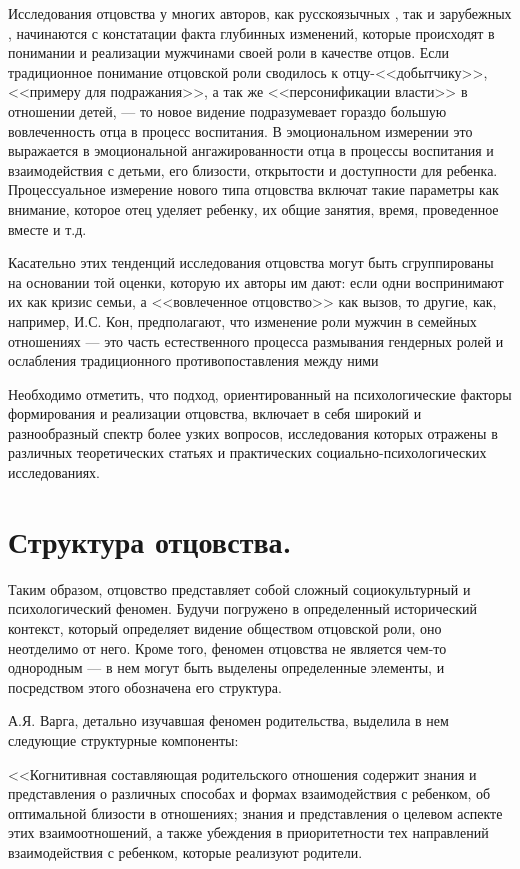 \documentclass{../../common/thesisbyxetex}
\begin{document}
Исследования отцовства у многих авторов, как русскоязычных \cite{relot, psyot}, так и зарубежных
\cite{meta, morfat, legfat}, начинаются с констатации факта глубинных изменений, которые происходят
в понимании и реализации мужчинами своей роли в качестве отцов. Если традиционное понимание
отцовской роли сводилось к отцу-<<добытчику>>, <<примеру для подражания>>, а так же
<<персонификации власти>> в отношении детей, --- то новое видение подразумевает гораздо большую
вовлеченность отца в процесс воспитания. В эмоциональном измерении это выражается в  эмоциональной
ангажированности отца в процессы воспитания и взаимодействия с детьми, его близости, открытости и
доступности для ребенка. Процессуальное измерение нового типа отцовства включат такие параметры как
внимание, которое отец уделяет ребенку, их общие занятия, время, проведенное вместе и т.д.


Касательно этих тенденций исследования отцовства могут быть сгруппированы на основании той оценки,
которую их авторы им дают: если одни воспринимают их как кризис семьи, а <<вовлеченное отцовство>>
как вызов, то другие, как, например, И.С. Кон, предполагают, что изменение роли мужчин в семейных
отношениях --- это часть естественного процесса размывания гендерных ролей и ослабления
традиционного противопоставления между ними \cite{konmen}

Необходимо отметить, что подход, ориентированный на психологические факторы формирования и
реализации отцовства, включает в себя широкий и разнообразный спектр более узких вопросов,
исследования которых отражены в различных теоретических статьях и практических
социально-психологических исследованиях.



\section{Структура отцовства.}

Таким образом, отцовство представляет собой сложный  социокультурный и психологический феномен.
Будучи погружено в определенный исторический контекст, который определяет видение обществом
отцовской роли, оно неотделимо от него. Кроме того, феномен отцовства не является чем-то однородным
--- в нем могут быть выделены определенные элементы, и посредством этого обозначена его структура.

А.Я. Варга, детально изучавшая феномен родительства, выделила в нем следующие структурные
компоненты:

<<Когнитивная составляющая родительского отношения содержит знания и
представления о различных способах и формах взаимодействия с ребенком, об
оптимальной близости в отношениях; знания и представления о целевом аспекте этих
взаимоотношений, а также убеждения в приоритетности тех направлений
взаимодействия с ребенком, которые реализуют родители.
\end{document}
